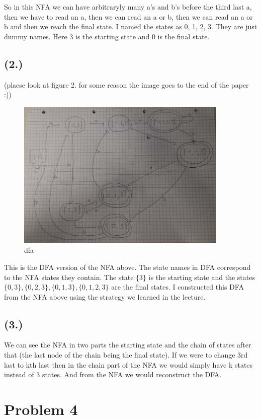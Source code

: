 \documentclass{article}
\begin{document}
So in this NFA we can have arbitraryly many a's and b's before the third last a, then we have to read an a, then we can read an a or b, then we can read an a or b and then we reach the final state.
I named the states as 0, 1, 2, 3. They are just dummy names. Here 3 is the starting state and 0 is the final state.

\subsection*{(2.)}

(plaese look at figure 2. for some reason the image goes to the end of the paper :))
\begin{figure}[h!]
  \centering
  \includegraphics[width=0.9\textwidth]{3_dfa.jpeg}
  \caption{dfa}
\end{figure}
This is the DFA version of the NFA above. The state names in DFA correspond to the NFA states they contain. The state \(\{3\}\) is the starting state
and the states \(\{0, 3\}, \{0,2,3\}, \{0,1,3\}, \{0,1,2,3\}\) are the final states. I constructed this DFA from the NFA above using the strategy we learned in the lecture.

\subsection*{(3.)}

We can see the NFA in two parts the starting state and the chain of states after that (the last node of the chain being the final state). If we were to change 3rd last to kth last
then in the chain part of the NFA we would simply have k states instead of 3 states. And from the NFA we would reconstruct the DFA.

\section*{Problem 4}
\end{document}
